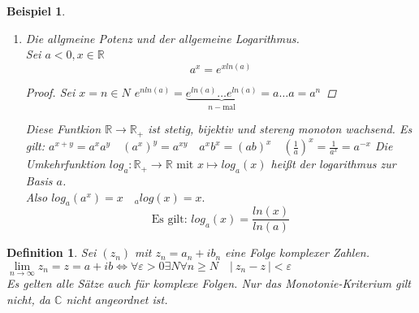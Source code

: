 \documentclass[a4paper,titlepage,oneside]{article}
\def\C{\ensuremath{\mathbb{C}} }
\def\R{\ensuremath{\mathbb{R}} }
\def\im{\ensuremath{\mathit{i}} }
\renewcommand{\epsilon}{\ensuremath{\varepsilon} }
\renewcommand{\liminf}[2][n]{\ensuremath{\lim\limits_{#1 \rightarrow \infty}{#2}}}
\newcommand{\abs}[1]{\ensuremath{\left|\:#1\:\right|}}
\theoremstyle{thmstyle}
\newtheorem{defi}[satz]{Definition}
\newtheorem{bsp}[satz]{Beispiel}
\begin{document}
\begin{bsp}
\begin{enumerate}
\begin{proof}
	Also $\liminf{exp(x)} = \infty$ und $\liminf{exp(x)} = 0$
	Es gibt daher eine stetige Umkehrfunktion $ ln : \R_+ \to  \R \text{ mit } x \mapsto ln(x)$ der natürliche Logarithmus.
	$ln$ ist wieder stetig und streng monoton wachsend.
\end{proof}
\[\text{Es gilt: } ln(x y) = ln(x) + ln(y)\]
	\begin{proof}
	$ ln(x) = \xi$ und $ ln(y) = \eta$\\
	d.h. $ e^{\xi} = x $ und $ e^{\eta} = y$\\
	$\Rightarrow e^{\xi + \eta} = e^{\xi} e^{\eta} = x y \qquad | ln \\
	\Rightarrow ln(e^{\xi + \eta}) = ln(xy) \\
	\Rightarrow \xi + \eta = ln(xy) \\
	\Rightarrow ln(x) + ln(y) = ln(xy)$
	\end{proof}
\item Die allgmeine Potenz und der allgemeine Logarithmus.\\
Sei $ a < 0, x \in \R$ \[a^x = e^{x ln(a)}\]
\begin{proof}
Sei $x = n \in N$
$e^{n ln(a)} = \underbrace{e^{ln(a)} \dots e^{ln(a)}}_{n-\text{mal}} = a\dots a = a ^n$
\end{proof}
Diese Funtkion $\R \to \R_+$ ist stetig, bijektiv und stereng monoton wachsend.
Es gilt: $a^{x+y} = a^x a^y \quad (a^x)^y = a^{xy} \quad a^x b^x = (ab)^x \quad (\frac{1}{a})^x = \frac{1}{a^x} = a^{-x}$
Die Umkehrfunktion $log_a : \R_+ \to \R \text{ mit } x \mapsto log_a(x)$ heißt der logarithmus zur Basis $a$.\\
Also $log_a(a^x) = x \quad _alog(x) = x.$
\[\text{Es gilt: } log_a(x) = \frac{ln(x)}{ln(a)}\]
\end{enumerate}
\end{bsp}

\begin{defi}
Sei $(z_n)$ mit $z_n = a_n + \im b_n$ eine Folge komplexer Zahlen. \\
$\liminf{z_n} = z = a+\im b \Leftrightarrow \forall \epsilon > 0 \exists N  \forall n \ge N \quad \abs{z_n - z} < \epsilon $\\
Es gelten alle Sätze auch für komplexe Folgen. Nur das Monotonie-Kriterium gilt nicht, da \C nicht angeordnet ist.
\end{defi}
\end{document}
